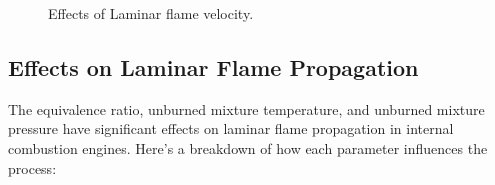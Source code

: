 \documentclass{article}
\begin{document}
\begin{figure}[h]
  \centering
  \hfill
  \vspace{0.5cm}
  \hfill
  \caption{Effects of Laminar flame velocity.}
  \label{fig:subfigures}
\end{figure}



\subsection*{Effects on Laminar Flame Propagation}
The equivalence ratio, unburned mixture temperature, and unburned mixture pressure have significant effects on laminar flame propagation in internal combustion engines. Here's a breakdown of how each parameter influences the process:
  
\end{document}
